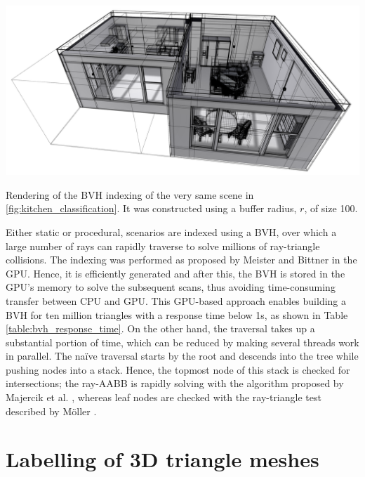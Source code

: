\begin{marginfigure}[.cm]
    \centering
    \includegraphics[width=\linewidth]{figs/lidar_simulation/bvh_rendering.png}
	\caption{Rendering of the BVH indexing of the very same scene in \ref{fig:kitchen_classification}. It was constructed using a buffer radius, $r$, of size 100.}
	\label{fig:lidar_bvh_rendering}
\end{marginfigure}
Either static or procedural, scenarios are indexed using a BVH, over which a large number of rays can rapidly traverse to solve millions of ray-triangle collisions. The indexing was performed as proposed by Meister and Bittner \cite{meister_parallel_2018} in the GPU. Hence, it is efficiently generated and after this, the BVH is stored in the GPU's memory to solve the subsequent scans, thus avoiding time-consuming transfer between CPU and GPU. This GPU-based approach enables building a BVH for ten million triangles with a response time below 1\si{\second}, as shown in Table \ref{table:bvh_response_time}. On the other hand, the traversal takes up a substantial portion of time, which can be reduced by making several threads work in parallel. The naïve traversal starts by the root and descends into the tree while pushing nodes into a stack. Hence, the topmost node of this stack is checked for intersections; the ray-AABB is rapidly solving with the algorithm proposed by Majercik et al. \cite{majercik_ray-box_2018}, whereas leaf nodes are checked with the ray-triangle test described by Möller \cite{moller_fast_1997}.

\section{Labelling of 3D triangle meshes}

